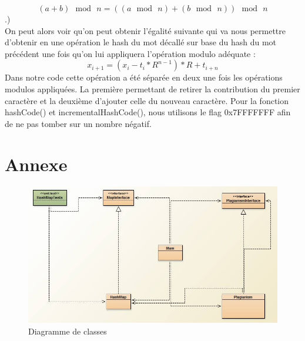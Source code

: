 \documentclass[11pt, frenchb]{article}
\begin{document}
$$ (a+b)\,\bmod\,n = ((a\,\bmod\,n)+(b\,\bmod\,n))\,\bmod\,n $$
.)\\ 
On peut alors voir qu'on peut obtenir l'égalité suivante qui va nous permettre d'obtenir en une opération le hash du mot décallé sur base du hash du mot précédent une fois qu'on lui appliquera l'opération modulo adéquate : 
$$ x_{i+1} = (x_i - t_i * R^{n-1}) * R + t_{i+n} $$
Dans notre code cette opération a été séparée en deux une fois les opérations modulos appliquées. La première permettant de retirer la contribution du premier caractère et la deuxième d'ajouter celle du nouveau caractère. Pour la fonction hashCode() et incrementalHashCode(), nous utilisons le flag 0x7FFFFFFF afin de ne pas tomber sur un nombre négatif.
\newpage
\section*{Annexe}
\begin{figure} [!h]
\centering
\includegraphics[scale=0.6]{diag.jpg}
\caption{Diagramme de classes}
\end{figure}
\end{document}

